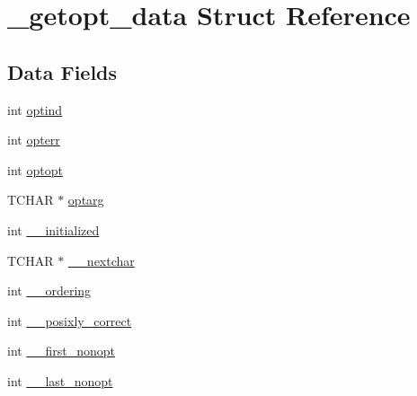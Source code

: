 \hypertarget{struct__getopt__data}{\section{\-\_\-getopt\-\_\-data Struct Reference}
\label{struct__getopt__data}
}
\subsection*{Data Fields}
\begin{DoxyCompactItemize}
\item 
int \hyperlink{struct__getopt__data_aad711e19c3d22c55b8a15202e7ebdd03}{optind}
\item 
int \hyperlink{struct__getopt__data_a725b984afac21949022119d74113f8da}{opterr}
\item 
int \hyperlink{struct__getopt__data_a79cf014d8fd77e44eb896af422117bc9}{optopt}
\item 
T\-C\-H\-A\-R $\ast$ \hyperlink{struct__getopt__data_a362f232c758f02250646557d7081109b}{optarg}
\item 
int \hyperlink{struct__getopt__data_ab7825fa4b5bf3663069ee9fbe8c2b844}{\-\_\-\-\_\-initialized}
\item 
T\-C\-H\-A\-R $\ast$ \hyperlink{struct__getopt__data_a62fb71170f7d2df0f73a31cb46c3424f}{\-\_\-\-\_\-nextchar}
\item 
int \hyperlink{struct__getopt__data_a6457d01e4071cc14f08383bca322ffd1}{\-\_\-\-\_\-ordering}
\item 
int \hyperlink{struct__getopt__data_a39d3dfecfbc726f1196a150c467bd9d5}{\-\_\-\-\_\-posixly\-\_\-correct}
\item 
int \hyperlink{struct__getopt__data_adccca7a9b8ee4e0d62d7d1cab8f92e20}{\-\_\-\-\_\-first\-\_\-nonopt}
\item 
int \hyperlink{struct__getopt__data_aa2f51727e008fcd9f2fec239fa86ec9e}{\-\_\-\-\_\-last\-\_\-nonopt}
\end{DoxyCompactItemize}


